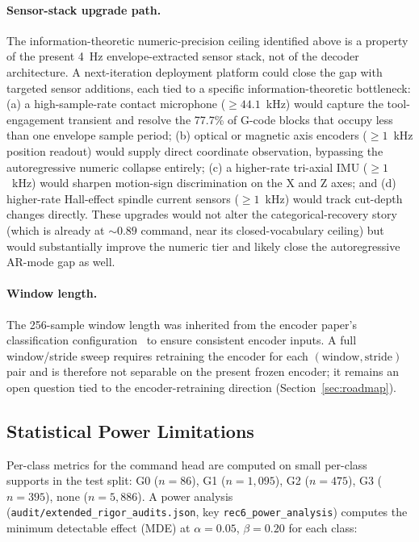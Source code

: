 \documentclass[sensors,article,submit,moreauthors,pdftex]{Definitions/mdpi}
\begin{document}
\paragraph{Sensor-stack upgrade path.} The information-theoretic numeric-precision ceiling identified above is a property of the present 4~Hz envelope-extracted sensor stack, not of the decoder architecture. A next-iteration deployment platform could close the gap with targeted sensor additions, each tied to a specific information-theoretic bottleneck: (a) a high-sample-rate contact microphone ($\geq 44.1$~kHz) would capture the tool-engagement transient and resolve the 77.7\% of G-code blocks that occupy less than one envelope sample period; (b) optical or magnetic axis encoders ($\geq 1$~kHz position readout) would supply direct coordinate observation, bypassing the autoregressive numeric collapse entirely; (c) a higher-rate tri-axial IMU ($\geq 1$~kHz) would sharpen motion-sign discrimination on the X and Z axes; and (d) higher-rate Hall-effect spindle current sensors ($\geq 1$~kHz) would track cut-depth changes directly. These upgrades would not alter the categorical-recovery story (which is already at $\sim\!0.89$ command, near its closed-vocabulary ceiling) but would substantially improve the numeric tier and likely close the autoregressive AR-mode gap as well.

\paragraph{Window length.} The 256-sample window length was inherited from the encoder paper's classification configuration~\cite{encoder_paper} to ensure consistent encoder inputs. A full window/stride sweep requires retraining the encoder for each $(\text{window}, \text{stride})$ pair and is therefore not separable on the present frozen encoder; it remains an open question tied to the encoder-retraining direction (Section~\ref{sec:roadmap}).

\subsection{Statistical Power Limitations}
\label{sec:lim-power}

Per-class metrics for the command head are computed on small per-class supports in the test split: G0 ($n\!=\!86$), G1 ($n\!=\!1{,}095$), G2 ($n\!=\!475$), G3 ($n\!=\!395$), none ($n\!=\!5{,}886$). A power analysis (\texttt{audit/extended\_rigor\_audits.json}, key \texttt{rec6\_power\_analysis}) computes the minimum detectable effect (MDE) at $\alpha\!=\!0.05$, $\beta\!=\!0.20$ for each class:
\end{document}
